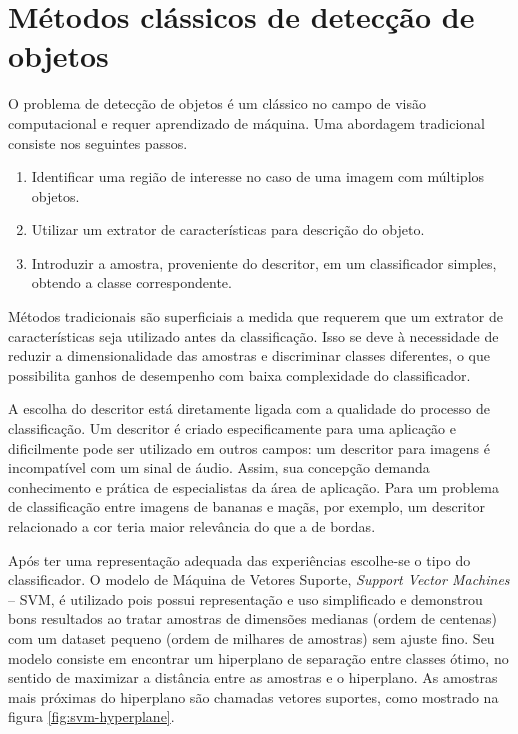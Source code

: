 \section{Métodos clássicos de detecção de objetos}
O problema de detecção de objetos é um clássico no campo de visão computacional e requer aprendizado de máquina. Uma abordagem tradicional \cite{traditional-objdetect} consiste nos seguintes passos.
	\begin{enumerate}
	\item Identificar uma região de interesse no caso de uma imagem com múltiplos objetos.
	\item Utilizar um extrator de características para descrição do objeto.
	\item Introduzir a amostra, proveniente do descritor, em um classificador simples, obtendo a classe correspondente.
	\end{enumerate}

Métodos tradicionais são superficiais a medida que requerem que um extrator de características seja utilizado antes da classificação. Isso se deve à necessidade de reduzir a dimensionalidade das amostras e discriminar classes diferentes, o que possibilita ganhos de desempenho com baixa complexidade do classificador.

A escolha do descritor está diretamente ligada com a qualidade do processo de classificação. Um descritor é criado especificamente para uma aplicação e dificilmente pode ser utilizado em outros campos: um descritor para imagens é incompatível com um sinal de áudio. Assim, sua concepção demanda conhecimento e prática de especialistas da área de aplicação. Para um problema de classificação entre imagens de bananas e maçãs, por exemplo, um descritor relacionado a cor teria maior relevância do que a de bordas.

Após ter uma representação adequada das experiências escolhe-se o tipo do classificador. O modelo de Máquina de Vetores Suporte, \textit{Support Vector Machines} -- SVM, é utilizado pois possui representação e uso simplificado e demonstrou bons resultados \cite{smith2001svm} ao tratar amostras de dimensões medianas (ordem de centenas) com um dataset pequeno (ordem de milhares de amostras) sem ajuste fino. Seu modelo consiste em encontrar um hiperplano de separação entre classes ótimo, no sentido de maximizar a distância entre as amostras e o hiperplano. As amostras mais próximas do hiperplano são chamadas vetores suportes, como mostrado na figura \ref{fig:svm-hyperplane}.

